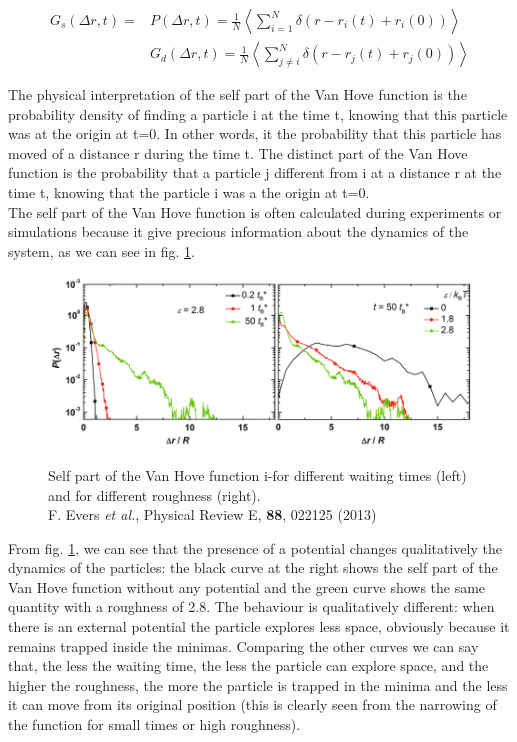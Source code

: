 \documentclass[a4paper,12pt]{article}
\newcommand{\etal}{\textit{et al.}}
\begin{document}
\begin{align}
G_s(\Delta r,t) = &P(\Delta r,t) = \frac{1}{N} \left< \sum_{i=1}^N \delta(r-r_i(t)+r_i(0)) \right>\\
&G_d(\Delta r,t) = \frac{1}{N} \left< \sum_{j\neq i}^N \delta(r-r_j(t)+r_j(0)) \right>
\end{align}

The physical interpretation of the self part of the Van Hove function is the probability density of finding a particle i at the time t, 
knowing that this particle was at the origin at t=0. In other words, it the probability that this particle has moved of a distance r during
the time t. The distinct part of the Van Hove function is the probability that a particle j different from i at a distance r at the time t,
knowing that the particle i was a the origin at t=0.\\
The self part of the Van Hove function is often calculated during experiments or simulations because it give precious information about the
dynamics of the system, as we can see in fig. \ref{spvhf exp}.

\begin{figure}[htbp]
\centering
\subfigure
{\includegraphics[width=14cm]{pics/spvhf_exp.png}}
\caption{Self part of the Van Hove function i-for different waiting times (left) and for different roughness (right).
\\F. Evers \etal, Physical Review E, \textbf{88}, 022125 (2013)}
\label{spvhf exp}
\end{figure}

From fig. \ref{spvhf exp}, we can see that the presence of a potential changes qualitatively the dynamics of the particles: the black curve
at the right shows the self part of the Van Hove function without any potential and the green curve shows the same quantity with a roughness
of 2.8. The behaviour is qualitatively different: when there is an external potential the particle explores less space, obviously because 
it remains trapped inside the minimas. Comparing the other curves we can say that, the less the waiting time, the less the particle can 
explore space, and the higher the roughness, the more the particle is trapped in the minima and the less it can move from its original 
position (this is clearly seen from the narrowing of the function for small times or high roughness).
\end{document}
